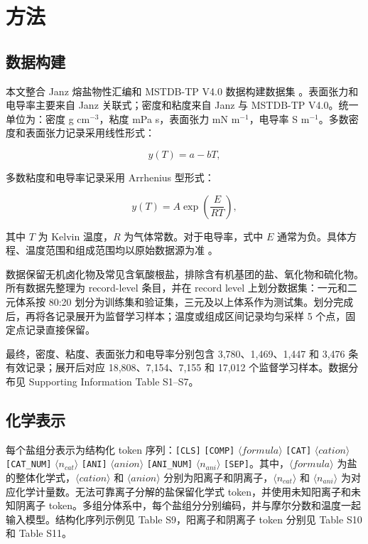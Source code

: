 \documentclass[journal=jctcce,manuscript=article,doi=true]{achemso}
\begin{document}
\section{方法}\label{ux65b9ux6cd5}

\subsection{数据构建}\label{ux6570ux636eux6784ux5efa}

本文整合 Janz 熔盐物性汇编和 MSTDB-TP V4.0 数据构建数据集 \cite{janz1988molten,chesser2025mstdb}。表面张力和电导率主要来自 Janz 关联式；密度和粘度来自 Janz 与 MSTDB-TP V4.0。统一单位为：密度 g cm\(^{-3}\)，粘度 mPa s，表面张力 mN m\(^{-1}\)，电导率 S m\(^{-1}\)。多数密度和表面张力记录采用线性形式：

\[
y(T)=a-bT,
\tag{1}
\]

多数粘度和电导率记录采用 Arrhenius 型形式：

\[
y(T)=A\exp\left(\frac{E}{RT}\right),
\tag{2}
\]

\noindent 其中 \(T\) 为 Kelvin 温度，\(R\) 为气体常数。对于电导率，式中 \(E\) 通常为负。具体方程、温度范围和组成范围均以原始数据源为准 \cite{janz1988molten,chesser2025mstdb}。

数据保留无机卤化物及常见含氧酸根盐，排除含有机基团的盐、氧化物和硫化物。所有数据先整理为 record-level 条目，并在 record level 上划分数据集：一元和二元体系按 80:20 划分为训练集和验证集，三元及以上体系作为测试集。划分完成后，再将各记录展开为监督学习样本；温度或组成区间记录均匀采样 5 个点，固定点记录直接保留。

最终，密度、粘度、表面张力和电导率分别包含 3,780、1,469、1,447 和 3,476 条有效记录；展开后对应 18,808、7,154、7,155 和 17,012 个监督学习样本。数据分布见 Supporting Information Table S1--S7。

\subsection{化学表示}\label{ux5316ux5b66ux8868ux793a}

每个盐组分表示为结构化 token 序列：\texttt{[CLS]} \texttt{[COMP]} \(\langle formula\rangle\) \texttt{[CAT]} \(\langle cation\rangle\) \texttt{[CAT\_NUM]} \(\langle n_{cat}\rangle\) \texttt{[ANI]} \(\langle anion\rangle\) \texttt{[ANI\_NUM]} \(\langle n_{ani}\rangle\) \texttt{[SEP]}。其中，\(\langle formula\rangle\) 为盐的整体化学式，\(\langle cation\rangle\) 和 \(\langle anion\rangle\) 分别为阳离子和阴离子，\(\langle n_{cat}\rangle\) 和 \(\langle n_{ani}\rangle\) 为对应化学计量数。无法可靠离子分解的盐保留化学式 token，并使用未知阳离子和未知阴离子 token。多组分体系中，每个盐组分分别编码，并与摩尔分数和温度一起输入模型。结构化序列示例见 Table S9，阳离子和阴离子 token 分别见 Table S10 和 Table S11。
\end{document}
